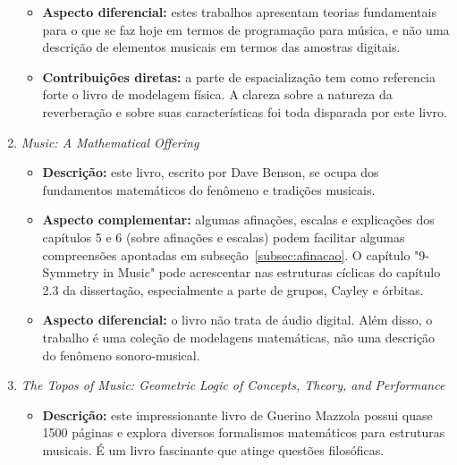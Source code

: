\begin{enumerate}
\begin{itemize}
            \item {\bf Aspecto diferencial:} estes trabalhos apresentam teorias fundamentais para o que se faz hoje em termos de programação para música, e não uma descrição de elementos musicais em termos das amostras digitais.
            \item {\bf Contribuições diretas:} a parte de espacialização tem como referencia forte o livro de modelagem física. A clareza sobre a natureza da reverberação e sobre suas características foi toda disparada por este livro.
        \end{itemize}
    \item \emph{Music: A Mathematical Offering}
        \begin{itemize}
            \item {\bf Descrição:} este livro, escrito por Dave Benson, se ocupa dos fundamentos matemáticos do fenômeno e tradições musicais.
            \item {\bf Aspecto complementar:} algumas afinações, escalas e explicações dos capítulos 5 e 6 (sobre afinações e escalas) podem facilitar algumas compreensões apontadas em subseção~\ref{subsec:afinacao}. O capítulo "9- Symmetry in Music" pode acrescentar nas estruturas cíclicas do capítulo 2.3 da dissertação, especialmente a parte de grupos, Cayley e órbitas.
            \item {\bf Aspecto diferencial:} o livro não trata de áudio digital. Além disso, o trabalho é uma coleção de modelagens matemáticas, não uma descrição do fenômeno sonoro-musical.
        \end{itemize}
    \item \emph{The Topos of Music: Geometric Logic of Concepts, Theory, and Performance}
        \begin{itemize}
            \item {\bf Descrição:} este impressionante livro de Guerino Mazzola possui quase 1500 páginas e explora diversos formalismos matemáticos para estruturas musicais. É um livro fascinante que atinge questões filosóficas.

\end{itemize}
\end{enumerate}
